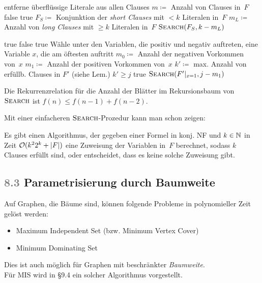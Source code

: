 \documentclass{cheat-sheet}
\newcommand{\size}[1]{\abs{#1}} %
\renewcommand{\O}{\mathcal{O}} %
\newcommand{\ceil}[1]{\lceil #1 \rceil} %
\newcommand{\scriptSection}[1]{\textcolor{gray}{#1}\enspace}
\begin{document}
\begin{algorithmic}
    \State entferne überflüssige Literale aus allen Clauses
    \State $m \coloneqq $ Anzahl von Clauses in~$F$
     \Return false \EndIf
    \If{$k \leq \ceil{m/2}$} \Return true \EndIf
    \State $F_S \coloneqq $ Konjunktion der \textit{short Clauses} mit $< k$ Literalen in~$F$
    \State $m_L \coloneqq $ Anzahl von \textit{long Clauses} mit $\geq k$ Literalen in~$F$
    \State \Return $\Call{Search}{F_S, k - m_L}$
  \EndFunction

     \Return true \EndIf
     \Return false \EndIf
      \State \Return true
    \EndIf
    \State Wähle unter den Variablen, die positiv und negativ auftreten,
    \State \quad eine Variable $x$, die am öftesten auftritt
    \State $m_0 \coloneqq $ Anzahl der negativen Vorkommen von~$x$
    \State $m_1 \coloneqq $ Anzahl der positiven Vorkommen von~$x$
      \State $k' \coloneqq $ max. Anzahl von erfüllb. Clauses in $F'$ (siehe Lem.)
      \State \Return $k' \geq j$
    \EndIf
      \Return true
    \EndIf
    \Return $\Call{Search}{F'|_{x=1}, j - m_1}$
  \EndFunction
\end{algorithmic}

\begin{beweisidee}
  Die Rekurrenzrelation für die Anzahl der Blätter im Rekursionsbaum von~$\Call{Search}{}$ ist $f(n) \leq f(n-1) + f(n-2)$.
\end{beweisidee}

Mit einer einfacheren $\Call{Search}{}$-Prozedur kann man schon zeigen:

\begin{satz}
  Es gibt einen Algorithmus, der gegeben einer Formel in konj. NF und $k \in \mathbb{N}$ in Zeit $\O(k^2 2^k + \size{F})$ eine Zuweisung der Variablen in~$F$ berechnet, sodass $k$ Clauses erfüllt sind, oder entscheidet, dass es keine solche Zuweisung gibt.
\end{satz}

\subsection{\scriptSection{8.3} Parametrisierung durch Baumweite}

\begin{motivation}
  Auf Graphen, die Bäume sind, können folgende Probleme in polynomieller Zeit gelöst werden:
  \begin{itemize}
    \item Maximum Independent Set (bzw. Minimum Vertex Cover)
    \item Minimum Dominating Set
  \end{itemize}
  Dies ist auch möglich für Graphen mit beschränkter \textit{Baumweite}. \\
  Für MIS wird in §9.4 ein solcher Algorithmus vorgestellt.
\end{motivation}
\end{document}
